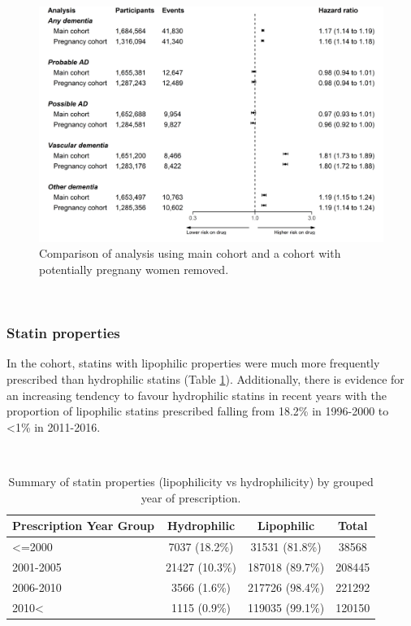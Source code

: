 \documentclass[a4paper, twoside]{templates/ociamthesis}
\begin{document}
\begin{figure}[H]
\includegraphics[width=1\linewidth]{figures/cprd-analysis/forester_pregnancy} \caption[Comparison of pregnancy analysis]{Comparison of analysis using main cohort and a cohort with potentially pregnany women removed.}\label{fig:pregnancyFig}
\end{figure}

~

\hypertarget{statin-properties-1}{%
\subsubsection{Statin properties}\label{statin-properties-1}}

In the cohort, statins with lipophilic properties were much more frequently prescribed than hydrophilic statins (Table \ref{tab:statinTypeTable-table}). Additionally, there is evidence for an increasing tendency to favour hydrophilic statins in recent years with the proportion of lipophilic statins prescribed falling from 18.2\% in 1996-2000 to \textless1\% in 2011-2016.

~





\begin{table}[H]

\caption[Summary of statin properties (lipophilicity vs hydrophilicity).]{\label{tab:statinTypeTable-table}Summary of statin properties (lipophilicity vs hydrophilicity) by grouped year of prescription.}
\centering
\fontsize{7}{9}\selectfont
\begin{tabular}[t]{lccc}
\toprule
\textbf{\textbf{Prescription Year Group}} & \textbf{\textbf{Hydrophilic}} & \textbf{\textbf{Lipophilic}} & \textbf{\textbf{Total}}\\
\midrule
<=2000 & 7037 (18.2\%) & 31531 (81.8\%) & 38568\\
\midrule
2001-2005 & 21427 (10.3\%) & 187018 (89.7\%) & 208445\\
\midrule
2006-2010 & 3566 (1.6\%) & 217726 (98.4\%) & 221292\\
\midrule
2010< & 1115 (0.9\%) & 119035 (99.1\%) & 120150\\
\bottomrule
\end{tabular}
\end{table}
\end{document}
